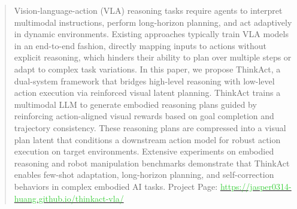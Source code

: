 \begin{abstract}
Vision-language-action (VLA) reasoning tasks require agents to interpret multimodal instructions, perform long-horizon planning, and act adaptively in dynamic environments. Existing approaches typically train VLA models in an end-to-end fashion, directly mapping inputs to actions without explicit reasoning, which hinders their ability to plan over multiple steps or adapt to complex task variations. In this paper, we propose ThinkAct, a dual-system framework that bridges high-level reasoning with low-level action execution via reinforced visual latent planning. ThinkAct trains a multimodal LLM to generate embodied reasoning plans guided by reinforcing action-aligned visual rewards based on goal completion and trajectory consistency. These reasoning plans are compressed into a visual plan latent that conditions a downstream action model for robust action execution on target environments. Extensive experiments on embodied reasoning and robot manipulation benchmarks demonstrate that ThinkAct enables few-shot adaptation, long-horizon planning, and self-correction behaviors in complex embodied AI tasks. Project Page: \textnormal{\href{https://jasper0314-huang.github.io/thinkact-vla/}{\textcolor{LimeGreen}{https://jasper0314-huang.github.io/thinkact-vla/}}}


\end{abstract}